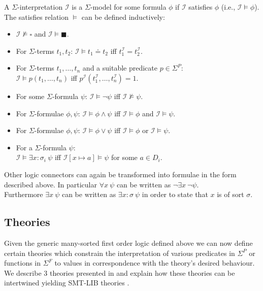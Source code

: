 \begin{definition}
A $\Sigma$-interpretation $\mathcal{I}$ is a $\Sigma$-model for some formula $\phi$ if $\mathcal{I}$ satisfies $\phi$ (i.e., $\mathcal{I}\vDash\phi$).\\
The satisfies relation $\vDash$ can be defined inductively:
\begin{itemize}
    \item $\mathcal{I} \nvDash \square$ and $\mathcal{I} \vDash \blacksquare$.
    \item For $\Sigma$-terms $t_1, t_2$: 
    $\mathcal{I}\vDash t_1\doteq t_2$ iff $t_1^\mathcal{I}=t_2^\mathcal{I}$. 
    \item For $\Sigma$-terms $t_1,\dots,t_n$ and a suitable predicate $p\in\Sigma^P$:\\
    $\mathcal{I}\vDash p\left(t_1,\dots,t_n\right)$ iff $p^\mathcal{I}(t_1^\mathcal{I},\dots,t^\mathcal{I}_n)=1$. 
    \item For some $\Sigma$-formula $\psi$:
    $\mathcal{I}\vDash \neg\psi$ iff $\mathcal{I} \nvDash \psi$.
    \item For $\Sigma$-formulae $\phi, \psi$:
    $\mathcal{I}\vDash \phi\land\psi$ iff $\mathcal{I}\vDash\phi$ and $\mathcal{I}\vDash\psi$.
    \item For $\Sigma$-formulae $\phi, \psi$:
    $\mathcal{I}\vDash \phi\lor\psi$ iff $\mathcal{I}\vDash\phi$ or $\mathcal{I}\vDash\psi$. 
    \item For a $\Sigma$-formula $\psi$:\\
    $\mathcal{I}\vDash \exists x\colon\!\sigma_i\ \psi$ iff $\mathcal{I}\left[x\mapsto a\right] \vDash \psi$ for some $a\in D_i$.
\end{itemize}
\end{definition}

Other logic connectors can again be transformed into formulae in the form described above. In particular $\forall x\ \psi$ can be written as $\neg\exists x\ \neg\psi$.\\
Furthermore $\exists x\ \psi$ can be written as $\exists x\colon\!\sigma\ \psi$ in order to state that $x$ is of sort $\sigma$.

\subsection{Theories}
Given the generic many-sorted first order logic defined above we can now define certain theories which constrain the interpretation of various predicates in $\Sigma^P$ or functions in $\Sigma^F$ to values in correspondence with the theory's desired behaviour. We describe 3 theories presented in \cite{Barrett-Tinelli-SMT} and explain how these theories can be intertwined yielding SMT-LIB theories \cite{BarFT-SMTLIB}.

